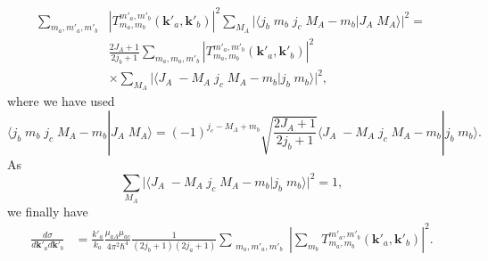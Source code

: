 \begin{subappendices}
\begin{equation}
\begin{split}
\sum_{m_a,m'_a,m'_b}&\left|T_{m_a,m_b}^{m'_a,m'_b}(\mathbf{k}'_a,\mathbf{k}'_b)\right|^2\sum_{M_A}\Big|\langle j_b\;m_b\;j_c\;M_A-m_b|J_A\;M_A\rangle\Big|^2=\\
&\frac{2J_A+1}{2j_b+1}\sum_{m_a,m_a,m'_b}\left|T_{m_a,m_b}^{m'_a,m'_b}(\mathbf{k}'_a,\mathbf{k}'_b)\right|^2\\
&\times\sum_{M_A}\Big|\langle J_A\;-M_A\;j_c\;M_A-m_b|j_b\;m_b\rangle\Big|^2,
\end{split}
\end{equation}
where we have used
\begin{equation}\label{eqC6AppG49}
\langle j_b\;m_b\;j_c\;M_A-m_b|J_A\;M_A\rangle=(-1)^{j_c-M_A+m_b}\sqrt{\frac{2J_A+1}{2j_b+1}}\langle J_A\;-M_A\;j_c\;M_A-m_b|j_b\;m_b\rangle.
\end{equation}
As
\begin{equation}\label{eqC6AppG50}
\sum_{M_A}\Big|\langle J_A\;-M_A\;j_c\;M_A-m_b|j_b\;m_b\rangle\Big|^2=1,
\end{equation}
we finally have
\begin{equation}\label{eqC6AppG51}
\begin{split}
\frac{d\sigma}{d\mathbf{k}'_ad\mathbf{k}'_b}&=\frac{k'_a}{k_a}\frac{\mu_{aA}\mu_{ac}}{4\pi^2\hbar^4}\frac{1}{(2j_b+1)(2j_a+1)}\sum_{\substack{m_a,m'_a,m'_b}}\left|\sum_{m_b} T_{m_a,m_b}^{m'_a,m'_b}(\mathbf{k}'_a,\mathbf{k}'_b)\right|^2.
\end{split}
\end{equation}

\end{subappendices}
